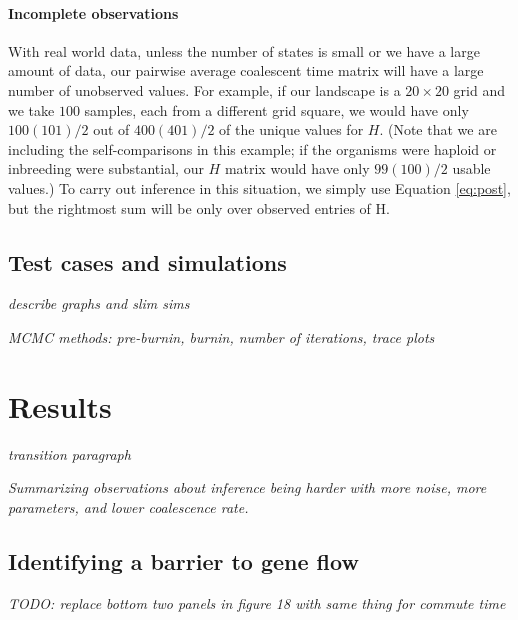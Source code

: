 \documentclass{article}
\newcommand{\plr}[1]{{\em \color{blue} #1}}
\begin{document}
\paragraph{Incomplete observations}
With real world data, 
unless the number of states is small or we have a large amount of data,
our pairwise average coalescent time matrix will have a large number of unobserved values.
For example, if our landscape is a $20 \times 20$ grid and we take $100$ samples, 
each from a different grid square,
we would have only $100(101)/2$ out of $400(401)/2$ of the unique values for $H$. 
(Note that we are including the self-comparisons in this example;
if the organisms were haploid or inbreeding were substantial,
our $H$ matrix would have only $99(100)/2$ usable values.)
To carry out inference in this situation,
we simply use Equation \ref{eq:post},
but the rightmost sum will be only over observed entries of H.

\subsection*{Test cases and simulations}

\plr{describe graphs and slim sims}

\plr{MCMC methods: pre-burnin, burnin, number of iterations, trace plots}


\section*{Results}

\plr{transition paragraph}

\plr{Summarizing observations about inference being harder with more noise,
more parameters,
and lower coalescence rate.}

\subsection*{Identifying a barrier to gene flow}
\label{sec:5x3b}

\plr{TODO: replace bottom two panels in figure 18 with same thing for commute time}
\end{document}
